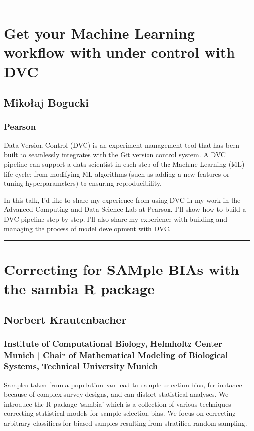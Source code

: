 \documentclass [12pt]{article}
\begin{document}
\noindent\rule{\textwidth}{1pt}
\section{Get your Machine Learning workflow with under control with DVC}
\subsection*{Mikołaj	Bogucki}
\subsubsection*{Pearson}

Data Version Control (DVC) is an experiment management tool that has been built to seamlessly integrates with the Git version control system. A DVC pipeline can support a data scientist in each step of the Machine Learning (ML) life cycle: from modifying ML algorithms (such as adding a new features or tuning hyperparameters) to ensuring reproducibility.

In this talk, I’d like to share my experience from using DVC in my work in the Advanced Computing and Data Science Lab at Pearson. I’ll show how to build a DVC pipeline step by step. I’ll also share my experience with building and managing the process of model development with DVC.

\noindent\rule{\textwidth}{1pt}
\section{Correcting for SAMple BIAs with the sambia R package}
\subsection*{Norbert	Krautenbacher}
\subsubsection*{Institute of Computational Biology, Helmholtz Center Munich | Chair of Mathematical Modeling of Biological Systems, Technical University Munich}

Samples taken from a population can lead to sample selection bias, for instance because of complex survey designs, and can distort statistical analyses. We introduce the R-package ‘sambia’ which is a collection of various techniques correcting statistical models for sample selection bias. We focus on correcting arbitrary classifiers for biased samples resulting from stratified random sampling.
\end{document}

